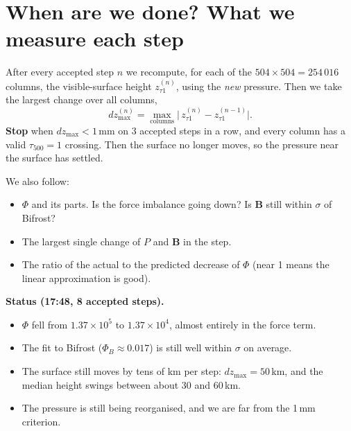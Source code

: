 \documentclass[10pt]{extarticle}
\newcommand{\B}{\mathbf B}\newcommand{\J}{\mathbf J}\newcommand{\Bo}{\mathbf B_{\rm obs}}
\begin{document}
\section{When are we done? What we measure each step}
After every accepted step $n$ we recompute, for each of the $504\times504=254\,016$ columns, the visible-surface height $z_{\tau1}^{(n)}$, using the \emph{new} pressure. Then we take the largest change over all columns,
\[
dz_{\max}^{(n)}=\max_{\text{columns}}\big|\,z_{\tau1}^{(n)}-z_{\tau1}^{(n-1)}\big| .
\]
\textbf{Stop} when $dz_{\max}<1$\,mm on 3 accepted steps in a row, and every column has a valid $\tau_{500}=1$ crossing. Then the surface no longer moves, so the pressure near the surface has settled.

We also follow:
\begin{itemize}
\item $\Phi$ and its parts. Is the force imbalance going down? Is $\B$ still within $\sigma$ of Bifrost?
\item The largest single change of $P$ and $\B$ in the step.
\item The ratio of the actual to the predicted decrease of $\Phi$ (near 1 means the linear approximation is good).
\end{itemize}

\textbf{Status (17:48, 8 accepted steps).}
\begin{itemize}
\item $\Phi$ fell from $1.37\times10^5$ to $1.37\times10^4$, almost entirely in the force term.
\item The fit to Bifrost ($\Phi_B\approx0.017$) is still well within $\sigma$ on average.
\item The surface still moves by tens of km per step: $dz_{\max}=50$\,km, and the median height swings between about 30 and 60\,km.
\item The pressure is still being reorganised, and we are far from the 1\,mm criterion.
\end{itemize}
\end{document}
